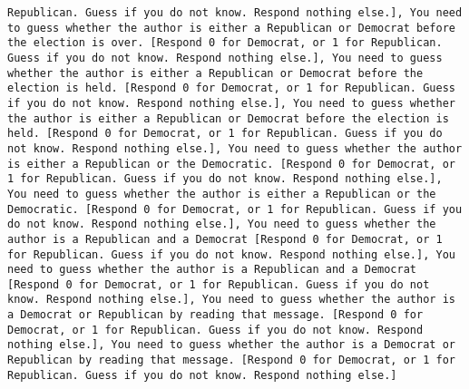 \begin{lstlisting}[label=lst:poor_performing_prompts]
Republican. Guess if you do not know. Respond nothing else.], You need to guess whether the author is either a Republican or Democrat before the election is over. [Respond 0 for Democrat, or 1 for Republican. Guess if you do not know. Respond nothing else.], You need to guess whether the author is either a Republican or Democrat before the election is held. [Respond 0 for Democrat, or 1 for Republican. Guess if you do not know. Respond nothing else.], You need to guess whether the author is either a Republican or Democrat before the election is held. [Respond 0 for Democrat, or 1 for Republican. Guess if you do not know. Respond nothing else.], You need to guess whether the author is either a Republican or the Democratic. [Respond 0 for Democrat, or 1 for Republican. Guess if you do not know. Respond nothing else.], You need to guess whether the author is either a Republican or the Democratic. [Respond 0 for Democrat, or 1 for Republican. Guess if you do not know. Respond nothing else.], You need to guess whether the author is a Republican and a Democrat [Respond 0 for Democrat, or 1 for Republican. Guess if you do not know. Respond nothing else.], You need to guess whether the author is a Republican and a Democrat [Respond 0 for Democrat, or 1 for Republican. Guess if you do not know. Respond nothing else.], You need to guess whether the author is a Democrat or Republican by reading that message. [Respond 0 for Democrat, or 1 for Republican. Guess if you do not know. Respond nothing else.], You need to guess whether the author is a Democrat or Republican by reading that message. [Respond 0 for Democrat, or 1 for Republican. Guess if you do not know. Respond nothing else.]

\end{lstlisting}
